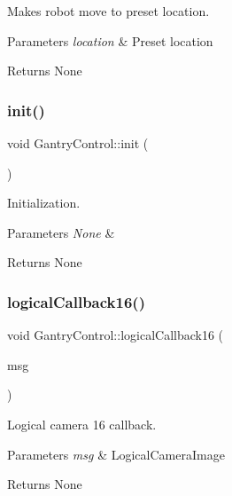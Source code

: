 Makes robot move to preset location. 


\begin{DoxyParams}{Parameters}
{\em location} & Preset location \\
\hline
\end{DoxyParams}
\begin{DoxyReturn}{Returns}
None 
\end{DoxyReturn}
\mbox{\label{classGantryControl_a71f13d325c732d931ed5ed175c5b3e7a}} 
\subsubsection{\texorpdfstring{init()}{init()}}
{\footnotesize\ttfamily void Gantry\+Control\+::init (\begin{DoxyParamCaption}{ }\end{DoxyParamCaption})}



Initialization. 


\begin{DoxyParams}{Parameters}
{\em None} & \\
\hline
\end{DoxyParams}
\begin{DoxyReturn}{Returns}
None 
\end{DoxyReturn}
\mbox{\label{classGantryControl_a9206feae49953cf691e0dec2331cc3ae}} 
\subsubsection{\texorpdfstring{logical\+Callback16()}{logicalCallback16()}}
{\footnotesize\ttfamily void Gantry\+Control\+::logical\+Callback16 (\begin{DoxyParamCaption}\item[{const nist\+\_\+gear\+::\+Logical\+Camera\+Image \&}]{msg }\end{DoxyParamCaption})}



Logical camera 16 callback. 


\begin{DoxyParams}{Parameters}
{\em msg} & Logical\+Camera\+Image \\
\hline
\end{DoxyParams}
\begin{DoxyReturn}{Returns}
None 
\end{DoxyReturn}
\mbox{\label{classGantryControl_a9d745504ec1dbcc8549f5a604f34bbcc}} 
